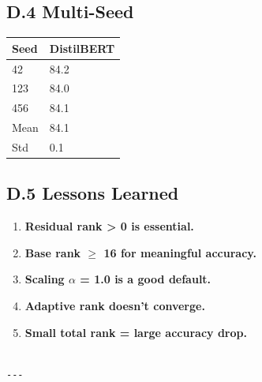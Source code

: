 \subsection{D.4 Multi-Seed}

\begin{table}[H]
\centering
\small
\begin{tabular}{ll}
\toprule
\textbf{Seed} & \textbf{DistilBERT} \\
\midrule
42 & 84.2 \\
123 & 84.0 \\
456 & 84.1 \\
Mean & 84.1 \\
Std & 0.1 \\
\bottomrule
\end{tabular}
\end{table}

\subsection{D.5 Lessons Learned}

\begin{enumerate}
\item \textbf{Residual rank \textgreater{} 0 is essential.}
\item \textbf{Base rank $\ge$ 16 for meaningful accuracy.}
\item \textbf{Scaling $\alpha$ = 1.0 is a good default.}
\item \textbf{Adaptive rank doesn't converge.}
\item \textbf{Small total rank = large accuracy drop.}
\end{enumerate}
\begin{lstlisting}

---
\end{lstlisting}